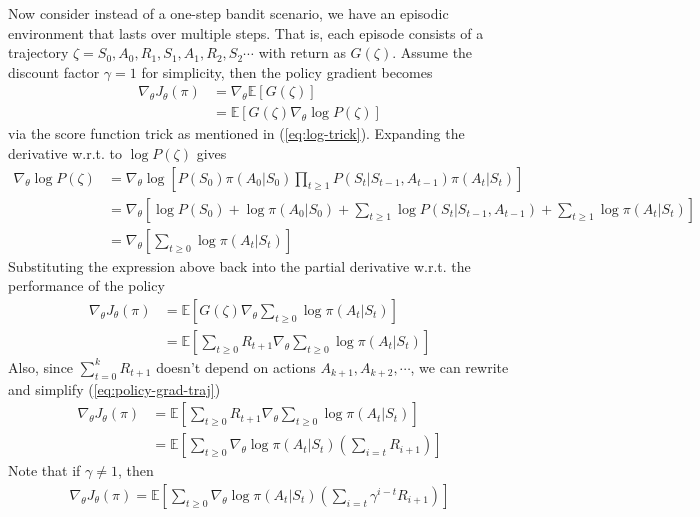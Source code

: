 \documentclass[12pt]{report}
\begin{document}
Now consider instead of a one-step bandit scenario, we have an episodic environment that lasts over multiple steps. That is, each episode consists of a trajectory $\zeta = S_0, A_0, R_1, S_1, A_1, R_2, S_2 \cdots$ with return as $G(\zeta)$. Assume the discount factor $\gamma = 1$ for simplicity, then the policy gradient becomes
\begin{align}
\nabla_\theta J_\theta (\pi) &= \nabla_\theta \mathbb{E}[G(\zeta)]\nonumber\\
&= \mathbb{E}[G(\zeta)\nabla_\theta \log P(\zeta)] \label{eq:policy-grad-traj}
\end{align}
via the score function trick as mentioned in (\ref{eq:log-trick}). Expanding the derivative w.r.t. to $\log P(\zeta)$ gives
\begin{align}
    \nabla_\theta \log P(\zeta) &= \nabla_\theta \log \left[P(S_0)\pi(A_0|S_0) \prod_{t\ge1} P(S_t|S_{t-1},A_{t-1})\pi(A_t|S_t) \right]\nonumber\\
    &=\nabla_\theta \left[\log P(S_0) + \log \pi(A_0|S_0) + \sum_{t\ge 1}\log P(S_t|S_{t-1},A_{t-1}) + \sum_{t\ge 1}\log \pi(A_t|S_t)\right]\nonumber\\
    &= \nabla_\theta \left[\sum_{t\ge0} \log \pi (A_t|S_t)\right]\nonumber
\end{align}
Substituting the expression above back into the partial derivative w.r.t. the performance of the policy
\begin{align}
    \nabla_\theta J_\theta(\pi) &= \mathbb{E}\left[G(\zeta) \nabla_\theta \sum_{t\ge0} \log \pi(A_t|S_t)\right]\nonumber\\
    &=\mathbb{E}\left[\sum_{t\ge0}R_{t+1} \nabla_\theta \sum_{t\ge0} \log \pi(A_t|S_t)\right] \nonumber
\end{align}
Also, since $\sum_{t=0}^k R_{t+1}$ doesn't depend on actions $A_{k+1}, A_{k+2}, \cdots$, we can rewrite and simplify (\ref{eq:policy-grad-traj})
\begin{align}
\nabla_\theta J_\theta(\pi) &= \mathbb{E}\left[\sum_{t\ge0} R_{t+1} \nabla_\theta \sum_{t\ge0} \log \pi(A_t|S_t)\right] \nonumber\\
&= \mathbb{E}\left[\sum_{t\ge0} \nabla_\theta \log \pi(A_t|S_t) \left(\sum_{i=t} R_{i+1}\right)\right] \label{eq:REINFORCE}
\end{align}
Note that if $\gamma \neq 1$, then
\begin{align}
\nabla_\theta J_\theta(\pi) = \mathbb{E}\left[\sum_{t\ge0}\nabla_\theta  \log \pi(A_t|S_t) \left(\sum_{i=t} \gamma^{i-t} R_{i+1}\right) \right] \label{eq1}
\end{align}
\end{document}
